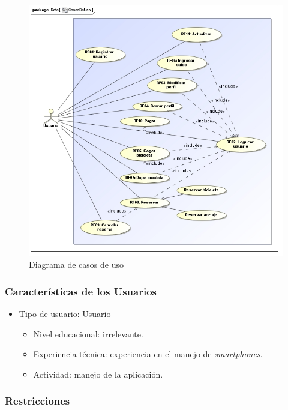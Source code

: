 \begin{figure} [!htb]
	\centering
	\includegraphics[width=\linewidth,height=\textheight,keepaspectratio]{Images/Diagramas/01_CasosDeUso}
	\caption{Diagrama de casos de uso}
	\label{fig:diagramaCasosUso}
\end{figure}


\subsubsection{Características de los Usuarios}

\begin{itemize}
	\item Tipo de usuario: Usuario
	\begin{itemize}
		\item Nivel educacional: irrelevante.
		\item Experiencia técnica: experiencia en el manejo de \textit{smartphones}.
		\item Actividad: manejo de la aplicación.
	\end{itemize}
\end{itemize}

\subsubsection{Restricciones}

